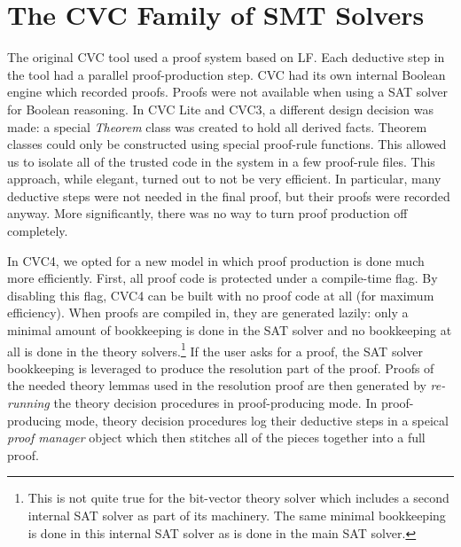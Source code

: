 \documentclass{llncs}
\begin{document}


\section{The CVC Family of SMT Solvers}
\label{sec:cvc}

The original CVC tool used a proof system based on LF.  Each deductive step in
the tool had a parallel proof-production step.  CVC had its own internal
Boolean engine which recorded proofs.  Proofs were not available when using a
SAT solver for Boolean reasoning.  In CVC Lite and CVC3, a different design
decision was made: a special \emph{Theorem} class was created to hold all
derived facts.  Theorem classes could only be constructed using special
proof-rule functions.  This allowed us to isolate all of the trusted code in
the system in a few proof-rule files.  This approach, while elegant, turned out
to not be very efficient.  In particular, many deductive steps were not needed
in the final proof, but their proofs were recorded anyway.  More significantly,
there was no way to turn proof production off completely.

In CVC4, we opted for a new model in which proof production is done much more efficiently.
First, all proof code is protected under a compile-time flag.  By
disabling this flag, CVC4 can be built with no proof code at all (for maximum
efficiency).  When proofs are compiled in, they are generated lazily: only a
minimal amount of bookkeeping is done in the SAT solver and no bookkeeping at
all is done in the theory solvers.\footnote{This is not quite true for the
  bit-vector theory solver which includes a second internal SAT solver as part
  of its machinery.  The same minimal bookkeeping is done in this internal SAT
  solver as is done in the main SAT solver.}  If the user asks for a proof, the SAT solver
bookkeeping is leveraged to produce the resolution part of the proof.  Proofs of the
needed theory lemmas used in the resolution proof are then 
generated by \emph{re-running} the theory decision procedures in
proof-producing mode.  In proof-producing mode, theory decision procedures log their
deductive steps in a speical \emph{proof manager} object which then stitches
all of the pieces together into a full proof.
\end{document}
